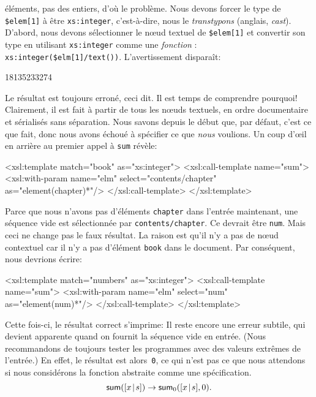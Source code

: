 éléments, pas des entiers, d'où le problème. Nous devons forcer le
type de \texttt{\$elem[1]} à être \texttt{xs:integer}, c'est-à-dire,
nous le \emph{transtypons} (anglais, \emph{cast}). D'abord, nous
devons sélectionner le n{\oe}ud textuel de \texttt{\$elem[1]} et
convertir son type en utilisant \texttt{xs:integer} comme une
\emph{fonction} \XPath:
\texttt{xs:integer(\$elm[1]/text()\!)}. L'avertissement disparaît:
\begin{sverb}
18135233274
\end{sverb}
Le résultat est toujours erroné, ceci dit. Il est temps de comprendre
pourquoi! Clairement, il est fait à partir de tous les n{\oe}uds
textuels, en ordre documentaire et sérialisés sans séparation. Nous
savons depuis le début que, par défaut, c'est ce que \XSLT fait, donc
nous avons échoué à spécifier ce que \emph{nous} voulions. Un coup
d'{\oe}il en arrière au premier appel à \texttt{sum} révèle:
\begin{sverb}
  <xsl:template match="book" as="xs:integer">
    <xsl:call-template name="sum">
      <xsl:with-param name="elm" select="contents/chapter"
                                 as="element(chapter)*"/>
    </xsl:call-template>
  </xsl:template>
\end{sverb}
Parce que nous n'avons pas d'éléments \texttt{chapter} dans l'entrée
maintenant, une séquence vide est sélectionnée par
\texttt{contents/chapter}. Ce devrait être \texttt{num}. Mais ceci ne
change pas le faux résultat. La raison est qu'il n'y a pas de n{\oe}ud
contextuel car il n'y a pas d'élément \texttt{book} dans le
document. Par conséquent, nous devrions écrire:
\begin{sverb}
  <xsl:template match="numbers" as="xs:integer">
    <xsl:call-template name="sum">
      <xsl:with-param name="elm" select="num"
                                 as="element(num)*"/>
    </xsl:call-template>
  </xsl:template>
\end{sverb}
Cette fois-ci, le résultat correct s'imprime:
\noindent Il reste encore une erreur subtile, qui devient apparente
quand on fournit la séquence vide en entrée. (Nous recommandons de
toujours tester les programmes avec des valeurs extrêmes de l'entrée.)
En effet, le résultat est alors~\texttt{0}, ce qui n'est pas ce que
nous attendons si nous considérons la fonction abstraite 
comme une spécification.
\begin{equation*}
\textsf{sum}([{x}\!\mid\!{s}]) \rightarrow \textsf{sum}_0([{x}\!\mid\!{s}],0).
\end{equation*}
